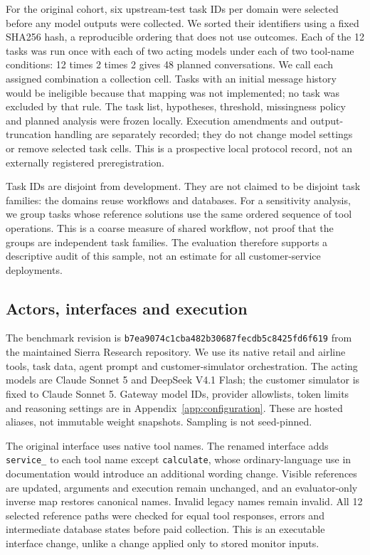 \documentclass[10pt]{article}
\begin{document}
For the original cohort, six upstream-test task IDs per domain were selected before any model outputs were collected. We sorted their identifiers using a fixed SHA256 hash, a reproducible ordering that does not use outcomes. Each of the 12 tasks was run once with each of two acting models under each of two tool-name conditions: 12 times 2 times 2 gives 48 planned conversations. We call each assigned combination a collection cell. Tasks with an initial message history would be ineligible because that mapping was not implemented; no task was excluded by that rule. The task list, hypotheses, threshold, missingness policy and planned analysis were frozen locally. Execution amendments and output-truncation handling are separately recorded; they do not change model settings or remove selected task cells. This is a prospective local protocol record, not an externally registered preregistration.

Task IDs are disjoint from development. They are not claimed to be disjoint task families: the domains reuse workflows and databases. For a sensitivity analysis, we group tasks whose reference solutions use the same ordered sequence of tool operations. This is a coarse measure of shared workflow, not proof that the groups are independent task families. The evaluation therefore supports a descriptive audit of this sample, not an estimate for all customer-service deployments.

\subsection{Actors, interfaces and execution}
The benchmark revision is \texttt{b7ea9074c1cba482b30687fecdb5c8425fd6f619} from the maintained Sierra Research repository. We use its native retail and airline tools, task data, agent prompt and customer-simulator orchestration. The acting models are Claude Sonnet 5 and DeepSeek V4.1 Flash; the customer simulator is fixed to Claude Sonnet 5. Gateway model IDs, provider allowlists, token limits and reasoning settings are in Appendix~\ref{app:configuration}. These are hosted aliases, not immutable weight snapshots. Sampling is not seed-pinned.

The original interface uses native tool names. The renamed interface adds \texttt{service\_} to each tool name except \texttt{calculate}, whose ordinary-language use in documentation would introduce an additional wording change. Visible references are updated, arguments and execution remain unchanged, and an evaluator-only inverse map restores canonical names. Invalid legacy names remain invalid. All 12 selected reference paths were checked for equal tool responses, errors and intermediate database states before paid collection. This is an executable interface change, unlike a change applied only to stored monitor inputs.
\end{document}
